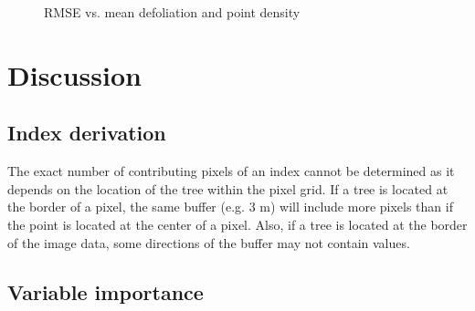 \documentclass[review]{elsarticle}
\begin{document}
\begin{figure} [b!]
	\begin{center}
		\caption{RMSE vs. mean defoliation and point density}
		\label{fig:rmse_defol_dens}
	\end{center}
\end{figure}

\section{Discussion}

\subsection{Index derivation}

The exact number of contributing pixels of an index cannot be determined as it depends on the location of the tree within the pixel grid.
If a tree is located at the border of a pixel, the same buffer (e.g. 3 m) will include more pixels than if the point is located at the center of a pixel.
Also, if a tree is located at the border of the image data, some directions of the buffer may not contain values.

\subsection{Variable importance}
\end{document}
